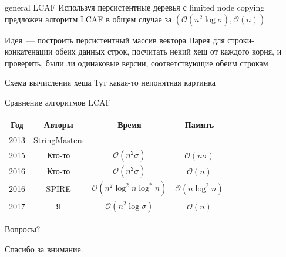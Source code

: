 \documentclass[hyperref=unicode,graphics=pdflatex,12pt]{beamer}
\begin{document}
\begin{frame}{general LCAF}
Используя персистентные деревья с limited node copying предложен алгоритм LCAF в общем случае за $(\mathcal{O}(n^2 \log \sigma), \mathcal{O}(n))$

\vspace{0.5cm}
Идея~--- построить персистентный массив вектора Парея для строки-конкатенации обеих данных строк, посчитать некий хеш от каждого корня, и проверить, были ли одинаковые версии, соответствующие обеим строкам
\end{frame}


\begin{frame}{Схема вычисления хеша}
Тут какая-то непонятная картинка
\end{frame}

\begin{frame}{Сравнение алгоритмов LCAF}
\begin{tabular}{|c|c|c|c|}
\hline
Год & Авторы & Время & Память \\
\hline
2013 & StringMasters & - & - \\
\hline
2015 & Кто-то & $\mathcal{O}(n^2 \sigma)$ & $\mathcal{O}(n \sigma)$ \\
\hline
2016 & Кто-то & $\mathcal{O}(n^2 \sigma)$ & $\mathcal{O}(n)$ \\
\hline
2016 & SPIRE & $\mathcal{O}(n^2 \log^2 n \log^* n)$ & $\mathcal{O}(n \log^2 n)$ \\
\hline
2017 & Я & $\mathcal{O}(n^2 \log \sigma)$ & $\mathcal{O}(n)$ \\
\hline
\end{tabular}
\end{frame}

\begin{frame}{Вопросы?}
\begin{center}
Спасибо за внимание.
\end{center}
\end{frame}
\end{document}
